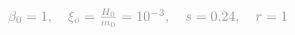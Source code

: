 \documentclass[preview]{standalone}
\begin{document}
$\textcolor{Gray}{\beta_0=1, \quad \xi_o = \frac{H_0}{m_0}= 10^{-3}, \quad s = 0.24,\quad r =1}$
\end{document}
